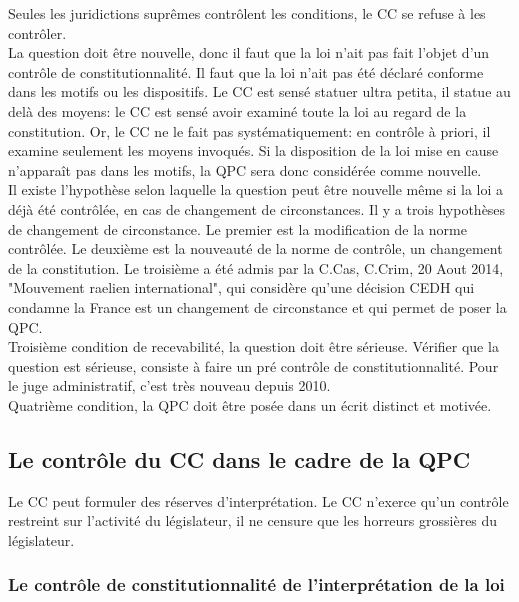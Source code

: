 \documentclass[10pt, a4paper, openany]{book}
\begin{document}
Seules les juridictions suprêmes contrôlent les conditions, le CC se refuse à les contrôler. \\
La question doit être nouvelle, donc il faut que la loi n'ait pas fait l'objet d'un contrôle de constitutionnalité. Il faut que la loi n'ait pas été déclaré conforme dans les motifs ou les dispositifs. Le CC est sensé statuer ultra petita, il statue au delà des moyens: le CC est sensé avoir examiné toute la loi au regard de la constitution. Or, le CC ne le fait pas systématiquement: en contrôle à priori, il examine seulement les moyens invoqués. Si la disposition de la loi mise en cause n'apparaît pas dans les motifs, la QPC sera donc considérée comme nouvelle. \\
Il existe l'hypothèse selon laquelle la question peut être nouvelle même si la loi a déjà été contrôlée, en cas de changement de circonstances. Il y a trois hypothèses de changement de circonstance. Le premier est la modification de la norme contrôlée. Le deuxième est la nouveauté de la norme de contrôle, un changement de la constitution. Le troisième a été admis par la C.Cas, C.Crim, 20 Aout 2014, "Mouvement raelien international", qui considère qu'une décision CEDH qui condamne la France est un changement de circonstance et qui permet de poser la QPC. \\
Troisième condition de recevabilité, la question doit être sérieuse. Vérifier que la question est sérieuse, consiste à faire un pré contrôle de constitutionnalité. Pour le juge administratif, c'est très nouveau depuis 2010. \\
Quatrième condition, la QPC doit être posée dans un écrit distinct et motivée. 

\subsection{Le contrôle du CC dans le cadre de la QPC}

Le CC peut formuler des réserves d'interprétation. Le CC n'exerce qu'un contrôle restreint sur l'activité du législateur, il ne censure que les horreurs grossières du législateur.

\subsubsection{Le contrôle de constitutionnalité de l'interprétation de la loi}
\end{document}
